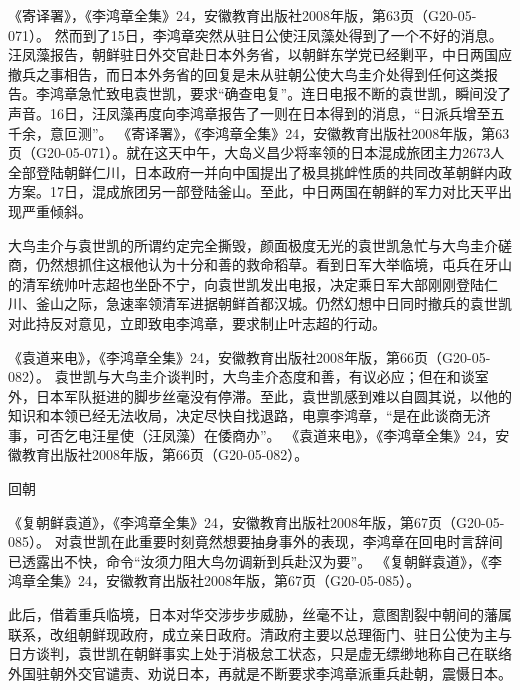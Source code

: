 \documentclass[12pt,UTF8]{ctexbook}
\begin{document}
《寄译署》，《李鸿章全集》24，安徽教育出版社2008年版，第63页（G20-05-071）。
然而到了15日，李鸿章突然从驻日公使汪凤藻处得到了一个不好的消息。汪凤藻报告，朝鲜驻日外交官赴日本外务省，以朝鲜东学党已经剿平，中日两国应撤兵之事相告，而日本外务省的回复是未从驻朝公使大鸟圭介处得到任何这类报告。李鸿章急忙致电袁世凯，要求“确查电复”。连日电报不断的袁世凯，瞬间没了声音。16日，汪凤藻再度向李鸿章报告了一则在日本得到的消息，“日派兵增至五千余，意叵测”。 《寄译署》，《李鸿章全集》24，安徽教育出版社2008年版，第63页（G20-05-071）。就在这天中午，大岛义昌少将率领的日本混成旅团主力2673人全部登陆朝鲜仁川，日本政府一并向中国提出了极具挑衅性质的共同改革朝鲜内政方案。17日，混成旅团另一部登陆釜山。至此，中日两国在朝鲜的军力对比天平出现严重倾斜。

大鸟圭介与袁世凯的所谓约定完全撕毁，颜面极度无光的袁世凯急忙与大鸟圭介磋商，仍然想抓住这根他认为十分和善的救命稻草。看到日军大举临境，屯兵在牙山的清军统帅叶志超也坐卧不宁，向袁世凯发出电报，决定乘日军大部刚刚登陆仁川、釜山之际，急速率领清军进据朝鲜首都汉城。仍然幻想中日同时撤兵的袁世凯对此持反对意见，立即致电李鸿章，要求制止叶志超的行动。

《袁道来电》，《李鸿章全集》24，安徽教育出版社2008年版，第66页（G20-05-082）。
袁世凯与大鸟圭介谈判时，大鸟圭介态度和善，有议必应；但在和谈室外，日本军队挺进的脚步丝毫没有停滞。至此，袁世凯感到难以自圆其说，以他的知识和本领已经无法收局，决定尽快自找退路，电禀李鸿章，“是在此谈商无济事，可否乞电汪星使（汪凤藻）在倭商办”。 《袁道来电》，《李鸿章全集》24，安徽教育出版社2008年版，第66页（G20-05-082）。

回朝

《复朝鲜袁道》，《李鸿章全集》24，安徽教育出版社2008年版，第67页（G20-05-085）。
对袁世凯在此重要时刻竟然想要抽身事外的表现，李鸿章在回电时言辞间已透露出不快，命令“汝须力阻大鸟勿调新到兵赴汉为要”。 《复朝鲜袁道》，《李鸿章全集》24，安徽教育出版社2008年版，第67页（G20-05-085）。

此后，借着重兵临境，日本对华交涉步步威胁，丝毫不让，意图割裂中朝间的藩属联系，改组朝鲜现政府，成立亲日政府。清政府主要以总理衙门、驻日公使为主与日方谈判，袁世凯在朝鲜事实上处于消极怠工状态，只是虚无缥缈地称自己在联络外国驻朝外交官谴责、劝说日本，再就是不断要求李鸿章派重兵赴朝，震慑日本。
\end{document}
